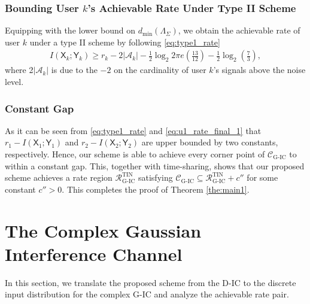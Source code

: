 \documentclass[12pt, draftclsnofoot, onecolumn]{IEEEtran}
\newcommand{\msf}[1]{\mathsf{#1}}
\theoremstyle{definition}
\begin{document}
\subsubsection{Bounding User $k$'s Achievable Rate Under Type II Scheme}
Equipping with the lower bound on $d_{\min}(\Lambda_{\Sigma})$, we obtain the achievable rate of user $k$ under a type II scheme by following \eqref{eq:type1_rate}
\begin{align}\label{eq:u1_rate_final_1}
I(\msf{X}_k;\msf{Y}_k) \geq  r_k -2|\mathcal{A}_k|- \frac{1}{2}\log_2 2\pi e \left(\frac{13}{12} \right)-\frac{1}{2}\log_2\left( \frac{7}{3}\right),
\end{align}
where 2$|\mathcal{A}_k|$ is due to the $-2$ on the cardinality of user $k$'s signals above the noise level.





\subsubsection{Constant Gap}
As it can be seen from \eqref{eq:type1_rate} and \eqref{eq:u1_rate_final_1} that $r_1-I(\msf{X}_1;\msf{Y}_1)$ and $r_2-I(\msf{X}_2;\msf{Y}_2)$ are upper bounded by two constants, respectively. Hence, our scheme is able to achieve every corner point of $\mathcal{C}_{\text{G-IC}}$ to within a constant gap. This, together with time-sharing, shows that our proposed scheme achieves a rate region $\mathcal{R}_{\text{G-IC}}^{\text{TIN}}$ satisfying $\mathcal{C}_{\text{G-IC}} \subseteq \mathcal{R}_{\text{G-IC}}^{\text{TIN}}+c''$ for some constant $c''>0$. This completes the proof of Theorem \ref{the:main1}.
















\section{The Complex Gaussian Interference Channel}\label{sec:G-IC_trans}\label{sec:CGIC}
In this section, we translate the proposed scheme from the D-IC to the discrete input distribution for the complex G-IC and analyze the achievable rate pair.
\end{document}
